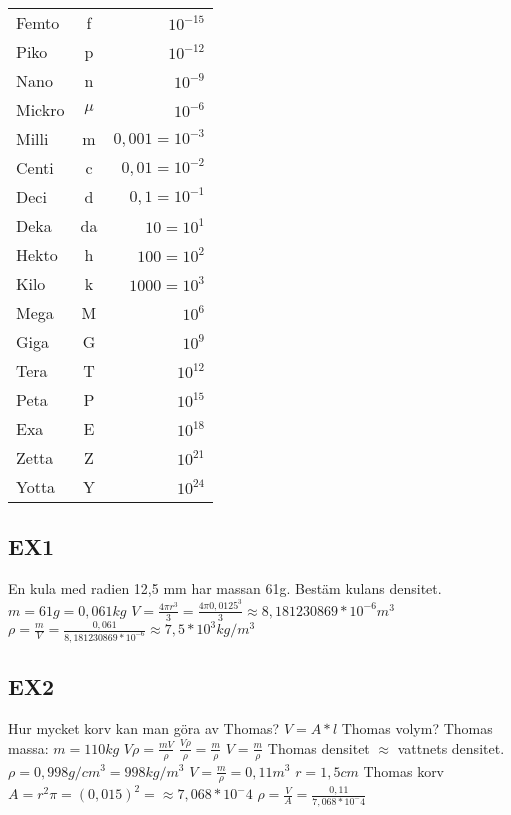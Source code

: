 \documentclass[a4paper,11pt]{article}
\begin{document}
\begin{flushleft}
\begin{tabular}{l c r}
  Femto & f & $ 10^{-15} $\\ 
  Piko & p & $ 10^{-12} $\\ 
  Nano & n & $ 10^{-9} $\\ 
  Mickro & $ \mu $ & $ 10^{-6} $\\ 
  Milli & m & $ 0,001 = 10^{-3} $\\
  Centi & c & $ 0,01 = 10^{-2} $\\
  Deci & d & $ 0,1 = 10^{-1}$\\
  Deka & da & $ 10 = 10^1 $\\
  Hekto & h & $ 100 = 10^2 $\\
  Kilo & k & $ 1000 = 10^3 $\\
  Mega & M & $ 10^6 $\\
  Giga & G & $ 10^9 $\\
  Tera & T & $ 10^{12} $\\
  Peta & P & $ 10^{15} $\\
  Exa & E & $ 10^{18} $\\
  Zetta & Z & $ 10^{21} $\\
  Yotta & Y & $ 10^{24} $\\
\end{tabular}
\newpage
\subsection{EX1}
En kula med radien 12,5 mm har massan 61g.\newline
Bestäm kulans densitet.\newline
$ m = 61g = 0,061 kg $\newline
$ V = \frac{4\pi r^3}{3} = \frac{4\pi 0,0125^3}{3} \approx 8,181230869*10^{-6} m^3 $\newline
$ \rho = \frac{m}{V} = \frac{0,061}{8,181230869*10^{-6}} \approx 7,5*10^3 kg/m^3 $\newline
\newline
\subsection{EX2}
Hur mycket korv kan man göra av Thomas?\newline
$ V = A*l $\newline
Thomas volym?\newline
Thomas massa: $ m=110kg $\newline
$ V \rho = \frac{mV}{\rho} $\newline
$ \frac{V\rho}{\rho} = \frac{m}{\rho} $\newline
$ V = \frac{m}{\rho} $ \newline
Thomas densitet $ \approx $ vattnets densitet.\newline
$ \rho = 0,998 g/cm^3 = 998 kg/m^3 $\newline
$ V= \frac{m}{\rho} = 0,11 m^3 $\newline
$ r = 1,5 cm $ Thomas korv\newline
$ A = r^2 \pi = (0,015)^2 =\approx 7,068*10^-4 $\newline
$ \rho = \frac{V}{A} = \frac{0,11}{7,068*10^-4} $\newline
\newline

\end{flushleft}
\end{document}
